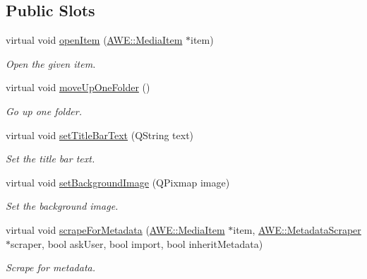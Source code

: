 \subsection*{Public Slots}
\begin{DoxyCompactItemize}
\item 
virtual void \hyperlink{class_u_i_1_1_folder_browser_aab9b07c1db373d5dc3a680d8055eaa05}{open\-Item} (\hyperlink{class_a_w_e_1_1_media_item}{A\-W\-E\-::\-Media\-Item} $\ast$item)
\begin{DoxyCompactList}\small\item\em Open the given item. \end{DoxyCompactList}\item 
virtual void \hyperlink{class_u_i_1_1_folder_browser_a1e86f8c04b6ffb53692c0a4c09ffff40}{move\-Up\-One\-Folder} ()
\begin{DoxyCompactList}\small\item\em Go up one folder. \end{DoxyCompactList}\item 
virtual void \hyperlink{class_u_i_1_1_folder_browser_a80c57bfbc13b0904861fb1d780fc0f0b}{set\-Title\-Bar\-Text} (Q\-String text)
\begin{DoxyCompactList}\small\item\em Set the title bar text. \end{DoxyCompactList}\item 
virtual void \hyperlink{class_u_i_1_1_folder_browser_a516b9a83e3ce774c493d26ce60b00309}{set\-Background\-Image} (Q\-Pixmap image)
\begin{DoxyCompactList}\small\item\em Set the background image. \end{DoxyCompactList}\item 
virtual void \hyperlink{class_u_i_1_1_folder_browser_a9ff48c48cf52c97d95c99b60ac5cff9a}{scrape\-For\-Metadata} (\hyperlink{class_a_w_e_1_1_media_item}{A\-W\-E\-::\-Media\-Item} $\ast$item, \hyperlink{class_a_w_e_1_1_metadata_scraper}{A\-W\-E\-::\-Metadata\-Scraper} $\ast$scraper, bool ask\-User, bool import, bool inherit\-Metadata)
\begin{DoxyCompactList}\small\item\em Scrape for metadata. \end{DoxyCompactList}\end{DoxyCompactItemize}
